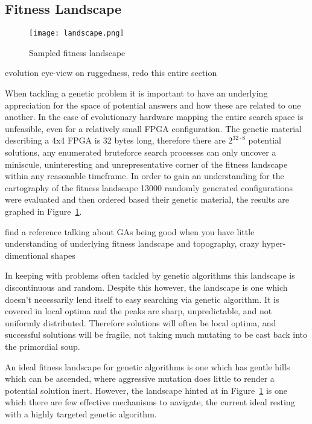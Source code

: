 \subsection{Fitness Landscape}

\begin{figure}
\centering
\texttt{[image: landscape.png]}
\caption{Sampled fitness landscape}
\label{fig:landscape}
\end{figure}

\todo evolution eye-view on ruggedness, redo this entire section

When tackling a genetic problem it is important to have an underlying appreciation
for the space of potential answers and how these are related to one another.
In the case of evolutionary hardware
mapping the entire search space is unfeasible, even for a relatively small
FPGA configuration.
The genetic material describing a 4x4 FPGA
is 32 bytes long, therefore there are $2^{32\cdot8}$ potential solutions, any
enumerated bruteforce search processes can only uncover a
miniscule, uninteresting and unrepresentative corner of the fitness landscape
within any reasonable timeframe.
In order to gain an understanding for the cartography of the fitness landscape
13000 randomly generated configurations were evaluated and then ordered based
their genetic material, the results are graphed in Figure~\ref{fig:landscape}.

\todo find a reference talking about GAs being good when you have little understanding
of underlying fitness landscape and topography, crazy hyper-dimentional shapes

In keeping with problems often tackled by genetic algorithms this landscape is discontinuous
and random. Despite this however,
the landscape is one which doesn't necessarily lend itself to easy searching via genetic algorithm.
It is covered in local optima and the peaks are sharp, unpredictable, and not uniformly
distributed. Therefore solutions will often be local optima, and successful solutions will
be fragile, not taking much mutating to be cast back into the primordial soup.

An ideal fitness landscape for genetic algorithms is one which has gentle hills
which can be ascended, where aggressive mutation does little to render a potential
solution inert. However, the landscape hinted at in Figure~\ref{fig:landscape} is
one which there are few effective mechanisms to navigate, the current ideal resting
with a highly targeted genetic algorithm.

